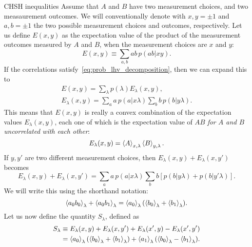 \documentclass[a4paper]{report}
\begin{document}
\begin{depthbox}[]{CHSH inequalities}
    Assume that $A$ and $B$ have two measurement choices, and two measaurement outcomes. We will conventionally denote with $x,y=\pm1$ and $a,b=\pm1$ the two possible measurement choices and outcomes, respectively.
    Let us define $E(x,y)$ as the expectation value of the product of the measurement outcomes measured by $A$ and $B$, when the measurement choices are $x$ and $y$:
    \begin{equation}
        E(x,y) \equiv \sum_{a,b} ab \, p(ab|xy).
    \end{equation}
    If the correlations satisfy~\cref{eq:prob_lhv_decomposition}, then we can expand this to
    \begin{equation}
    \begin{gathered}
        E(x,y) = \sum_\lambda p(\lambda) E_\lambda(x,y), \\
        E_\lambda(x,y) = \sum_a a\,p(a|x\lambda)\sum_b b\,p(b|y\lambda).
    \end{gathered}
    \end{equation}
    This means that $E(x,y)$ is really a convex combination of the expectation values $E_\lambda(x, y)$, each one of which is the expectation value of $AB$ \emph{for $A$ and $B$ uncorrelated with each other}:
    \begin{equation}
        E_\lambda(x,y) = \expval{A}_{x,\lambda} \expval{B}_{y,\lambda}.
    \end{equation}
    If $y,y'$ are two different measurement choices, then $E_\lambda(x,y)+E_\lambda(x,y')$ becomes
    \begin{equation}
        E_\lambda(x,y) + E_\lambda(x,y') =
        \sum_a a\,p(a|x\lambda) \sum_b b[p(b|y\lambda) + p(b|y'\lambda)].
    \end{equation}
    We will write this using the shorthand notation:
    \begin{equation}
        \expval{a_0 b_0}_\lambda + \expval{a_0 b_1}_\lambda =
        \expval{a_0}_\lambda (\expval{b_0}_\lambda + \expval{b_1}_\lambda).
    \end{equation}
    Let us now define the quantity $S_\lambda$, defined as
    \begin{equation}
    \begin{aligned}
        S_\lambda &\equiv
            E_\lambda(x,y) + E_\lambda(x,y') + E_\lambda(x',y) - E_\lambda(x',y') \\
        &= \expval{a_0}_\lambda (\expval{b_0}_\lambda + \expval{b_1}_\lambda)
        + \expval{a_1}_\lambda (\expval{b_0}_\lambda - \expval{b_1}_\lambda).

\end{aligned}
\end{equation}
\end{depthbox}
\end{document}
